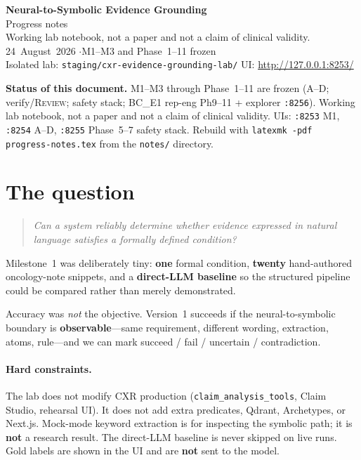 \documentclass[11pt,a4paper]{article}
\newcommand{\rev}{\textsc{Review}}
\begin{document}
\begin{center}
{\LARGE\bfseries Neural-to-Symbolic Evidence Grounding}\\[0.35em]
{\large Progress notes}\\[0.8em]
{\color{muted} Working lab notebook, not a paper and not a claim of clinical validity.}\\[0.6em]
24~August~2026 \quad$\cdot$\quad M1--M3 and Phase~1--11 frozen\\[0.3em]
{\small Isolated lab: \texttt{staging/cxr-evidence-grounding-lab/}
\quad UI: \url{http://127.0.0.1:8253/}}
\end{center}

\vspace{0.6em}
\begin{tcolorbox}[colback=paper,colframe=black!20,boxrule=0.4pt,arc=1pt,left=8pt,right=8pt,top=6pt,bottom=6pt]
\textbf{Status of this document.}
M1--M3 through Phase~1--11 are frozen (A--D; verify/\rev; safety stack; BC\_E1 rep-eng Ph9--11 + explorer \texttt{:8256}).
Working lab notebook, not a paper and not a claim of clinical validity.
UIs: \texttt{:8253} M1, \texttt{:8254} A--D, \texttt{:8255} Phase~5--7 safety stack.
Rebuild with \texttt{latexmk -pdf progress-notes.tex} from the \texttt{notes/} directory.
\end{tcolorbox}

\tableofcontents
\vspace{0.8em}

\section{The question}

\begin{quote}
\textit{Can a system reliably determine whether evidence expressed in natural language satisfies a formally defined condition?}
\end{quote}

Milestone~1 was deliberately tiny: \textbf{one} formal condition, \textbf{twenty} hand-authored oncology-note snippets, and a \textbf{direct-LLM baseline} so the structured pipeline could be compared rather than merely demonstrated.

Accuracy was \emph{not} the objective. Version~1 succeeds if the neural-to-symbolic boundary is \textbf{observable}---same requirement, different wording, extraction, atoms, rule---and we can mark succeed / fail / uncertain / contradiction.

\paragraph{Hard constraints.}
The lab does not modify CXR production (\texttt{claim\_analysis\_tools}, Claim Studio, rehearsal UI).
It does not add extra predicates, Qdrant, Archetypes, or Next.js.
Mock-mode keyword extraction is for inspecting the symbolic path; it is \textbf{not} a research result.
The direct-LLM baseline is never skipped on live runs.
Gold labels are shown in the UI and are \textbf{not} sent to the model.
\end{document}

